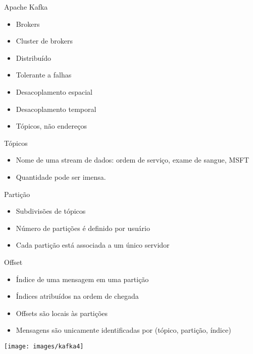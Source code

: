 \begin{frame}{Apache Kafka}
\begin{itemize}
	\item Brokers
	\item Cluster de brokers
	\item Distribuído
	\item Tolerante a falhas
	\item Desacoplamento espacial
	\item Desacoplamento temporal
	\item Tópicos, não endereços
\end{itemize}
\end{frame}

\begin{frame}{Tópicos}
\begin{itemize}
	\item Nome de uma stream de dados: ordem de serviço, exame de sangue, MSFT
	\item Quantidade pode ser imensa.
\end{itemize}
\end{frame}

\begin{frame}{Partição}
\begin{itemize}
	\item Subdivisões de tópicos
	\item Número de partições é definido por usuário
	\item Cada partição está associada a um único servidor
\end{itemize}
\end{frame}

\begin{frame}{Offset}
\begin{itemize}
	\item Índice de uma mensagem em uma partição
	\item Índices atribuídos na ordem de chegada
	\item Offsets são locais às partições
	\item Mensagens são unicamente identificadas por (tópico, partição, índice)
\end{itemize}

\texttt{[image: images/kafka4]}

\end{frame}


